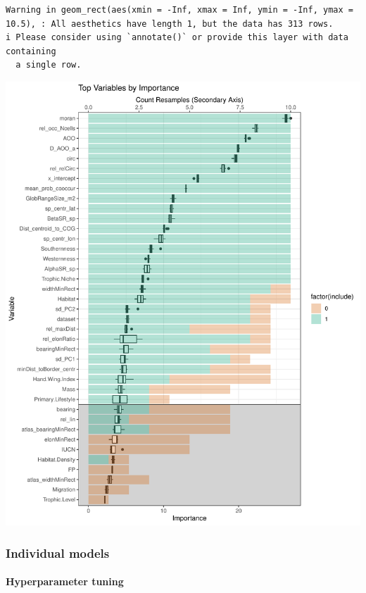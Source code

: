 \documentclass[
  letterpaper,
  DIV=11,
  numbers=noendperiod]{scrartcl}
\let\oldparagraph\paragraph
\renewcommand{\paragraph}[1]{\oldparagraph{#1}\mbox{}}
\begin{document}
\begin{verbatim}
Warning in geom_rect(aes(xmin = -Inf, xmax = Inf, ymin = -Inf, ymax = 10.5), : All aesthetics have length 1, but the data has 313 rows.
i Please consider using `annotate()` or provide this layer with data containing
  a single row.
\end{verbatim}

\includegraphics{MachineLearning_StaticPatterNN_Report_files/figure-pdf/rfe-results-2.pdf}

\subsubsection{Individual models}\label{individual-models}

\paragraph{Hyperparameter tuning}\label{hyperparameter-tuning}
\end{document}
